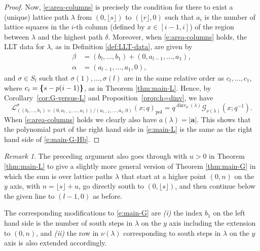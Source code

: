 \documentclass[12pt]{amsart}
\theoremstyle{definition}
\theoremstyle{remark}
\newtheorem{remark}[thm]{Remark}
\newcommand{\aA}{{\mathbf a}}
\newcommand{\Gcal}{{\mathcal G}}
\newcommand{\Lcal}{{\mathcal L}}
\DeclareMathOperator{\dinv}{dinv}
\DeclareMathOperator{\pol}{pol}
\newcommand{\fp}[1]{{\boldsymbol \{} #1 {\boldsymbol \}}}
\begin{document}
\begin{proof}
Now, \eqref{e:area-columns} is precisely the condition for there to
exist a (unique) lattice path $\lambda $ from $(0,\lfloor s \rfloor)$
to $(\lfloor r \rfloor,0)$ such that $a_{i}$ is the number of lattice
squares in the $i$-th column (defined by $x\in [i-1,i]$) of the region
between $\lambda $ and the highest path $\delta $.  Moreover, when
\eqref{e:area-columns} holds, the LLT data for $\lambda $, as in
Definition \ref{def:LLT-data}, are given by
\begin{equation}\label{e:particular-LLT-data}
\begin{aligned}
\beta &	 = (b_{l},\ldots,b_{1})+(0, a_{l-1},\ldots,a_{1}),\\
\alpha & = (a_{l-1},\ldots,a_{1},0),
\end{aligned}
\end{equation}
and $\sigma \in S_{l}$ such that $\sigma (1),\ldots,\sigma (l)$ are in
the same relative order as $c_{l},\ldots,c_{1}$, where $c_{i} =
\fp{s-p(i-1)}$, as in Theorem \ref{thm:main-L}.  Hence, by 
Corollary~\ref{cor:G-versus-L} and Proposition~\ref{prop:h=dinv},
we have
\begin{equation}\label{e:L=G}
\Lcal ^{\sigma }_{((b_{l},\ldots,b_{1})+(0,
a_{l-1},\ldots,a_{1}))/(a_{l-1},\ldots,a_{1},0)}(x;q)_{\pol}
= q^{\dinv
_{p}(\lambda )} \Gcal_{\nu (\lambda )}(x;q^{-1}).
\end{equation}
When \eqref{e:area-columns} holds we clearly also have $a(\lambda ) =
|\aA |$.  This shows that the polynomial part of the right hand side
in \eqref{e:main-L} is the same as the right hand side of
\eqref{e:main-G-Hb}.
\end{proof}

\begin{remark}\label{rem:y-extension}
The preceding argument also goes through with $u>0$ in Theorem
\ref{thm:main-L} to give a slightly more general version of Theorem
\ref{thm:main-G} in which the sum is over lattice paths $\lambda $
that start at a higher point $(0,n)$ on the $y$ axis, with $n =
\lfloor s \rfloor + u$, go directly south to $(0,\lfloor s \rfloor)$,
and then continue below the given line to $(l-1,0)$ as before.

The corresponding modifications to \eqref{e:main-G} are {\em (i)} the
index $b_{1}$ on the left hand side is the number of south steps in
$\lambda $ on the $y$ axis including the extension to $(0,n)$, and
{\em (ii)} the row in $\nu (\lambda )$ corresponding to south steps in
$\lambda $ on the $y$ axis is also extended accordingly.
\end{remark}
\end{document}
